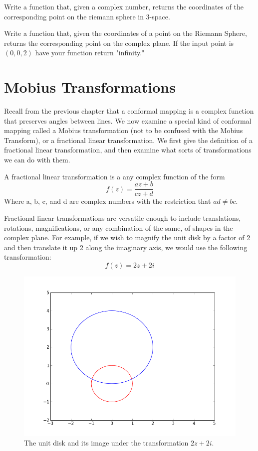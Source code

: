 \begin{problem}  Write a function that, given a complex number, returns the coordinates of the corresponding point on the riemann sphere in 3-space.
\end{problem}

\begin{problem}
Write a function that, given the coordinates of a point on the Riemann Sphere, returns the corresponding point on the complex plane.
If the input point is $(0,0,2)$ have your function return "infinity."
\end{problem}

\section*{Mobius Transformations}

Recall from the previous chapter that a conformal mapping is a complex function that preserves angles between lines.
We now examine a special kind of conformal mapping called a Mobius transformation (not to be confused with the Mobius Transform), or a fractional linear transformation.
We first give the definition of a fractional linear transformation, and then examine what sorts of transformations we can do with them.

\begin{definition} A fractional linear transformation is a any complex function of the form
\[
f(z) = \frac{az + b}{cz + d}
\]
 Where a, b, c, and d are complex numbers with the restriction that $ad \neq bc$.
\end{definition}

Fractional linear transformations are versatile enough to include translations, rotations, magnifications, or any combination of the same, of shapes in the complex plane.
For example, if we wish to magnify the unit disk by a factor of 2 and then translate it up 2 along the imaginary axis, we would use the following transformation:
\[
f(z)=2z+2i
\]

\begin{figure}
\includegraphics[width=\textwidth]{mobius1.png}
\caption{The unit disk and its image under the transformation $2z+2i$.}
\label{riemann:mobius1}
\end{figure}


